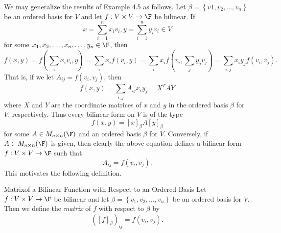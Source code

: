 \documentclass[math_245.tex]{subfiles}
\begin{document}
    \begin{remark}
        We may generalize the results of Example 4.5 as follows. Let $\beta = \left\lbrace v1,v_2,\ldots,v_n \right\rbrace $ be an ordered basis for $V$ and let $f:V\times V\to\F$ be bilinear. If
        \begin{equation*}
            x = \sum^{n}_{i=1} x_iv_i, y = \sum^{n}_{i=1} y_iv_i\in V
        \end{equation*}
        for some $x_1,x_2,\ldots,x_n, \ldots, y_n\in\F$, then
        \begin{equation*}
            f(x,y) = f\left( \sum^{}_{i} x_iv_i,y \right) = \sum^{}_{i} x_if\left( v_i,y \right) = \sum^{}_{i} x_if\left( v_i, \sum^{}_{j} y_jv_j \right) = \sum^{}_{i,j} x_iy_jf\left( v_i,v_j \right) . 
        \end{equation*}
        That is, if we let $A_{ij} = f\left( v_i,v_j \right)$, then
        \begin{equation*}
            f\left( x,y \right) = \sum^{}_{i,j} A_{ij}x_iy_j = X^TAY
        \end{equation*}
        where $X$ and $Y$ are the coordinate matrices of $x$ and $y$ in the ordered basis $\beta$ for $V$, respectively. Thus every bilinear form on $V$ is of the type
        \begin{equation*}
            f\left( x,y \right) = \left[ x \right] _\beta A\left[ y \right] _\beta
        \end{equation*}
        for some $A\in M_{n\times n}(\F)$ and an ordered basis $\beta$ for $V$. Conversely, if $A\in M_{n\times n}(\F)$ is given, then clearly the above equation defines a bilinear form $f:V\times V\to\F$ such that
        \begin{equation*}
            A_{ij} = f\left( v_i,v_j \right) .
        \end{equation*}
        This motivates the following definition.
    \end{remark}

    \begin{definition}{Matrix}{of a Bilinear Function with Respect to an Ordered Basis}
        Let $f:V\times V\to\F$ be bilinear and let $\beta = \left\lbrace v_1,v_2,\ldots,v_n \right\rbrace$ be an ordered basis for $V$. Then we define the \emph{matrix} of $f$ with respect to $\beta$ by
        \begin{equation*}
            \left( \left[ f \right] _\beta \right) _{ij} = f\left( v_i,v_j \right) .
        \end{equation*}
    \end{definition}
    
\end{document}
